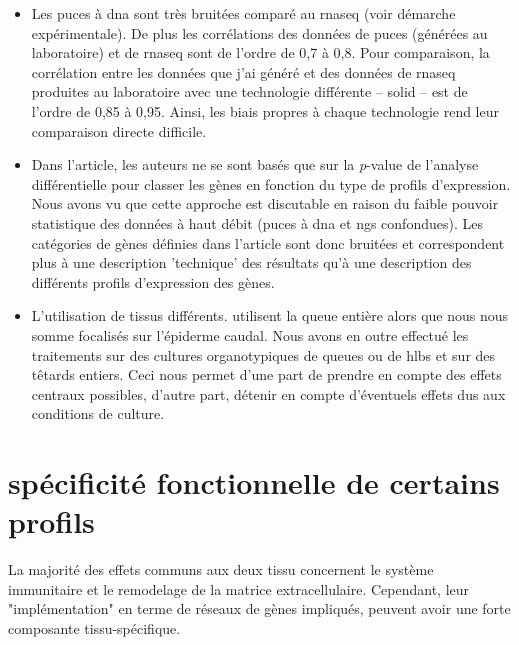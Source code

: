 \documentclass[../main.tex]{subfiles}
\begin{document}
	\begin{itemize}
		\item
			Les puces à \gls{dna} sont très bruitées comparé au \gls{rnaseq} (voir démarche expérimentale).
			De plus les corrélations des données de puces (générées au laboratoire) et de \gls{rnaseq} sont de l'ordre de 0,7 à 0,8.
			Pour comparaison, la corrélation entre les données que j'ai généré et des données de \gls{rnaseq} produites au laboratoire avec une technologie différente – \gls{solid} – est de l'ordre de 0,85 à 0,95.
			Ainsi, les biais propres à chaque technologie rend leur comparaison directe difficile.
		\item
			Dans l'article, les auteurs ne se sont basés que sur la \textit{p}-value de l'analyse différentielle pour classer les gènes en fonction du type de profils d'expression.
			Nous avons vu que cette approche est discutable en raison du faible pouvoir statistique des données à haut débit (puces à \gls{dna} et \gls{ngs} confondues).
			Les catégories de gènes définies dans l'article sont donc bruitées et correspondent plus à une description 'technique' des résultats qu'à une description des différents profils d'expression des gènes.
		\item
			L'utilisation de tissus différents.
			\citep{Kulkarni2011} utilisent la queue entière alors que nous nous somme focalisés sur l'épiderme caudal.
			Nous avons en outre effectué les traitements sur des cultures organotypiques de queues ou de \glspl{hlb} et sur des têtards entiers.
			Ceci nous permet d'une part de prendre en compte des effets centraux possibles, d'autre part, détenir en compte d'éventuels effets dus aux conditions de culture.
	\end{itemize}


\section{spécificité fonctionnelle de certains profils}

	La majorité des effets communs aux deux tissu concernent le système immunitaire et le remodelage de la matrice extracellulaire.
	Cependant, leur "implémentation" en terme de réseaux de gènes impliqués, peuvent avoir une forte composante tissu-spécifique.
\end{document}

